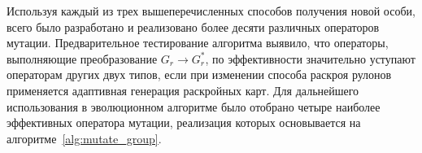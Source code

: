 \documentclass[12pt]{article}
\begin{document}
Используя каждый из трех вышеперечисленных способов получения новой особи, 
всего было разработано и реализовано более десяти различных операторов мутации. 
Предварительное тестирование алгоритма выявило, что операторы, выполняющие 
преобразование $G_r \rightarrow G_r^*$, по эффективности значительно уступают 
операторам других двух типов, если при изменении способа раскроя рулонов 
применяется адаптивная генерация раскройных карт. Для дальнейшего использования 
в эволюционном алгоритме было отобрано четыре наиболее эффективных оператора 
мутации, реализация которых основывается на алгоритме~\ref{alg:mutate_group}. 
\end{document}
